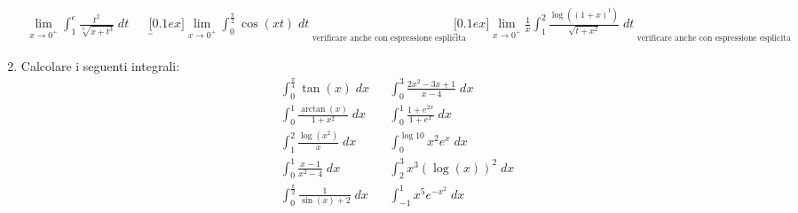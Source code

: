 \begin{enumerate}
\begin{align*}
		      \lim_{x \to 0^{+}} \int_{1}^{e} \frac{t^2 }{\sqrt[3]{x + t ^3 }} \; dt &  & \underbracket[0.1ex]{\lim_{x \to 0^{+}} \int_{0}^{\frac{\pi}{2}} \cos \left(xt\right) \; dt}_{\text{ verificare anche con espressione esplicita }} &  & \underbracket[0.1ex]{\lim_{x \to 0^{+}} \frac{1}{x} \int_{1}^{2} \frac{\log \left(\left(1 + x\right)^{t}\right)}{\sqrt{ t + x^2 }} \; dt}_{\text{ verificare anche con espressione esplicita }}
	      \end{align*}
	\item Calcolare i seguenti integrali:
	      \begin{align*}
		       & \int_{0}^{\frac{\pi}{4}} \tan \left(x\right) \; dx               &  & \int_{0 }^{3 }\frac{2 x^2  - 3x + 1}{x - 4} \; dx           \\
		       & \int_{0}^{1} \frac{\arctan\left(x\right)}{1 + x^2 } \; dx        &  & \int_{0}^{1} \frac{1 + e^{2x }}{1 + e^{x}} \; dx            \\
		       & \int_{1}^{2}  \frac{\log \left(x^2 \right)}{x} \; dx             &  & \int_{0}^{ \log 10} x^2  e^{x} \; dx                        \\
		       & \int_{0}^{1} \frac{x-1}{x^2  -4} \; dx                           &  & \int_{2}^{3} x^3  \left(\log \left(x\right)\right)^2  \; dx \\
		       & \int_{0}^{\frac{\pi}{2}} \frac{1}{\sin \left(x\right) + 2} \; dx &  & \int_{-1}^{1} x^{5}e^{ - x^2 } \; dx
	      \end{align*}
\end{enumerate}
